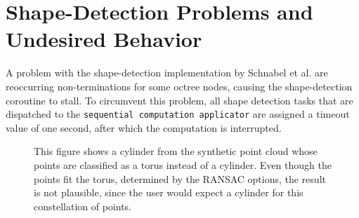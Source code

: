 \section{Shape-Detection Problems and Undesired Behavior}
\label{sec:shape_detection_problems}

A problem with the shape-detection implementation by Schnabel et al. \cite{schnabel-2007-software} are reoccurring non-terminations for some octree nodes, causing the shape-detection coroutine to stall. To circumvent this problem, all shape detection tasks that are dispatched to the \verb|sequential computation applicator| are assigned a timeout value of one second, after which the computation is interrupted. 

\begin{figure}[b]
\centering
{}%
{}      
\caption[Implausible torus is detected instead of a more plausible cylinder. ]
{This figure shows a cylinder from the synthetic point cloud whose points are classified as a torus instead of a cylinder. Even though the points fit the torus, determined by the RANSAC options, the result is not plausible, since the user would expect a cylinder for this constellation of points. }
\label{fig:missfittedTorus}
\end{figure}


